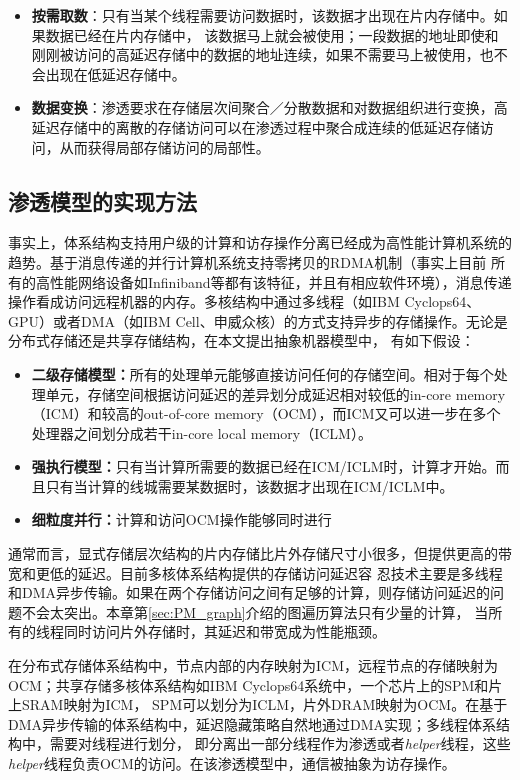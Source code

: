\begin{flushleft}
\begin{itemize}	
	\item {\bf 按需取数}：只有当某个线程需要访问数据时，该数据才出现在片内存储中。如果数据已经在片内存储中，
	该数据马上就会被使用；一段数据的地址即使和刚刚被访问的高延迟存储中的数据的地址连续，如果不需要马上被使用，也不会出现在低延迟存储中。

	\item {\bf 数据变换}：渗透要求在存储层次间聚合／分散数据和对数据组织进行变换，高延迟存储中的离散的存储访问可以在渗透过程中聚合成连续的低延迟存储访问，从而获得局部存储访问的局部性。
\end{itemize}

\subsection{渗透模型的实现方法}\label{sec:percolation_method}

事实上，体系结构支持用户级的计算和访存操作分离已经成为高性能计算机系统的趋势。基于消息传递的并行计算机系统支持零拷贝的RDMA机制（事实上目前
所有的高性能网络设备如Infiniband等都有该特征，并且有相应软件环境），消息传递操作看成访问远程机器的内存。多核结构中通过多线程（如IBM Cyclops64、GPU）或者DMA（如IBM Cell、申威众核）的方式支持异步的存储操作。无论是分布式存储还是共享存储结构，在本文提出抽象机器模型中，
有如下假设：
\begin{itemize}
	\item {\bf 二级存储模型：}所有的处理单元能够直接访问任何的存储空间。相对于每个处理单元，存储空间根据访问延迟的差异划分成延迟相对较低的in-core memory （ICM）和较高的out-of-core memory（OCM），而ICM又可以进一步在多个处理器之间划分成若干in-core local memory（ICLM）。
	\item {\bf 强执行模型：}只有当计算所需要的数据已经在ICM/ICLM时，计算才开始。而且只有当计算的线城需要某数据时，该数据才出现在ICM/ICLM中。
	\item {\bf 细粒度并行：}计算和访问OCM操作能够同时进行
\end{itemize}

通常而言，显式存储层次结构的片内存储比片外存储尺寸小很多，但提供更高的带宽和更低的延迟。目前多核体系结构提供的存储访问延迟容
忍技术主要是多线程和DMA异步传输。如果在两个存储访问之间有足够的计算，则存储访问延迟的问题不会太突出。本章第\ref{sec:PM_graph}介绍的图遍历算法只有少量的计算，
当所有的线程同时访问片外存储时，其延迟和带宽成为性能瓶颈。

在分布式存储体系结构中，节点内部的内存映射为ICM，远程节点的存储映射为OCM；共享存储多核体系结构如IBM
Cyclops64系统中，一个芯片上的SPM和片上SRAM映射为ICM，
SPM可以划分为ICLM，片外DRAM映射为OCM。在基于DMA异步传输的体系结构中，延迟隐藏策略自然地通过DMA实现；多线程体系结构中，需要对线程进行划分，
即分离出一部分线程作为渗透或者{\it helper}线程，这些{\it
	helper}线程负责OCM的访问。在该渗透模型中，通信被抽象为访存操作。


\end{flushleft}
